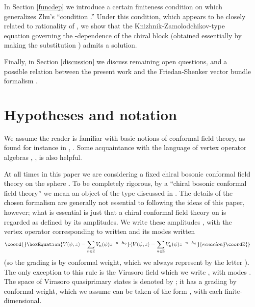 \documentclass[a4paper,12pt]{article}
\providecommand{\Z}{{\mathbb Z}}
\providecommand{\uu}{{\mathbf u}}
\providecommand{\PP}{{\mathbb P}}
\providecommand{\IP}[1]{\langle#1\rangle}
\begin{document}
In Section \ref{funcdep} we introduce a certain finiteness condition on \coordHE{} which generalizes
Zhu's ``condition \coordHE{}.''  Under this condition, which appears to be closely related to rationality of \coordHE{}, we show that
the Knizhnik-Zamolodchikov-type equation governing the \myHighlight{$\uu$}\coordHE{}-dependence of the chiral block (obtained
essentially by making the substitution \coordHE{}) admits
a solution.

Finally, in Section \ref{discussion} we discuss remaining open questions,
and a possible relation between
the present work and the Friedan-Shenker vector bundle formalism
\cite{FS}.


\section{Hypotheses and notation} \label{notation}

We assume the reader is familiar with basic notions of conformal field
theory, as found for instance in \cite{DFMS}, \cite{Greview}.  Some
acquaintance with the language of vertex operator algebras \cite{FLM},
\cite{Kac}, \cite{Borch} is also helpful.

At all times in this paper we are considering a fixed chiral bosonic conformal field theory
on the sphere \myHighlight{$\PP$}\coordHE{}.  To be completely rigorous, by a ``chiral bosonic conformal field theory'' we mean
an object of the type discussed in \cite{GG}.  The details of the chosen formalism are generally not
essential to following the ideas of this paper, however; what is essential is just that a chiral conformal field
theory on \myHighlight{$\PP$}\coordHE{} is regarded as defined by its amplitudes.
We write these amplitudes \myHighlight{$\IP{\prod_{a=1}^k V(\psi_a, z_a)}$}\coordHE{}, with the vertex operator corresponding
to \myHighlight{$\psi$}\coordHE{} written \coordHE{}
and its modes written 
\begin{equation}\coord{}\boxEquation{
V(\psi, z) = \sum_{n \in \Z} V_n(\psi) z^{-n-h_\psi}
}{
V(\psi, z) = \sum_{n \in \Z} V_n(\psi) z^{-n-h_\psi}
}{ecuacion}\coordE{}\end{equation}
(so the grading is by conformal weight, which we always represent by the letter \coordHE{}).
The only exception to this rule is the Virasoro field which we write \coordHE{}, with modes \coordHE{}.
The space of Virasoro quasiprimary states is denoted by \coordHE{}; it has a grading by conformal weight, which we assume
can be taken of the form
\coordHE{}, with each \coordHE{} finite-dimensional.
\end{document}
